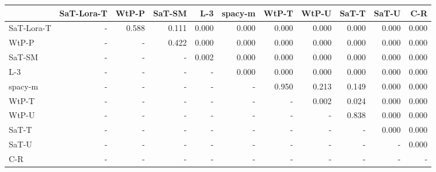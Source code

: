 \begin{tabular}{lrrrrrrrrrr}
\toprule
 & SaT-Lora-T & WtP-P & SaT-SM & L-3 & spacy-m & WtP-T & WtP-U & SaT-T & SaT-U & C-R \\
\midrule
SaT-Lora-T & - & 0.588 & 0.111 & 0.000 & 0.000 & 0.000 & 0.000 & 0.000 & 0.000 & 0.000 \\
WtP-P & - & - & 0.422 & 0.000 & 0.000 & 0.000 & 0.000 & 0.000 & 0.000 & 0.000 \\
SaT-SM & - & - & - & 0.002 & 0.000 & 0.000 & 0.000 & 0.000 & 0.000 & 0.000 \\
L-3 & - & - & - & - & 0.000 & 0.000 & 0.000 & 0.000 & 0.000 & 0.000 \\
spacy-m & - & - & - & - & - & 0.950 & 0.213 & 0.149 & 0.000 & 0.000 \\
WtP-T & - & - & - & - & - & - & 0.002 & 0.024 & 0.000 & 0.000 \\
WtP-U & - & - & - & - & - & - & - & 0.838 & 0.000 & 0.000 \\
SaT-T & - & - & - & - & - & - & - & - & 0.000 & 0.000 \\
SaT-U & - & - & - & - & - & - & - & - & - & 0.000 \\
C-R & - & - & - & - & - & - & - & - & - & - \\
\bottomrule
\end{tabular}

